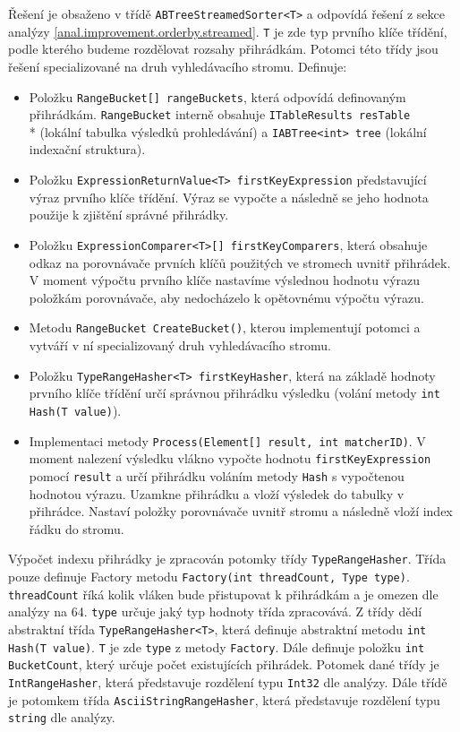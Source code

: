 Řešení je obsaženo v třídě \texttt{ABTreeStreamedSorter<T>} a odpovídá řešení z sekce analýzy \ref{anal.improvement.orderby.streamed}.
\texttt{T} je zde typ prvního klíče třídění, podle kterého budeme rozdělovat rozsahy přihrádkám.
Potomci této třídy jsou řešení specializované na druh vyhledávacího stromu.
Definuje:
\begin{itemize}
\item Položku \texttt{RangeBucket[] rangeBuckets}, která odpovídá definovaným přihrádkám.
\texttt{RangeBucket} interně obsahuje \texttt{ITableResults resTable}\\* (lokální tabulka výsledků prohledávání) a \texttt{IABTree<int> tree} (lokální indexační struktura).

\item Položku \texttt{ExpressionReturnValue<T> firstKeyExpression} představující výraz prvního klíče třídění.
Výraz se vypočte a následně se jeho hodnota použije k zjištění správné přihrádky.
\item Položku \texttt{ExpressionComparer<T>[] firstKeyComparers}, která obsahuje odkaz na porovnávače prvních klíčů použitých ve stromech uvnitř přihrádek.
V moment výpočtu prvního klíče nastavíme výslednou hodnotu výrazu položkám porovnávače, aby nedocházelo k opětovnému výpočtu výrazu.
\item Metodu \texttt{RangeBucket CreateBucket()}, kterou implementují potomci a vytváří v ní specializovaný druh vyhledávacího stromu.
\item Položku \texttt{TypeRangeHasher<T> firstKeyHasher}, která na základě hodnoty prvního klíče třídění určí správnou přihrádku výsledku (volání metody \texttt{int Hash(T value)}).
\item Implementaci metody \texttt{Process(Element[] result, int matcherID)}.
V moment nalezení výsledku vlákno vypočte hodnotu \texttt{firstKeyExpression} pomocí \texttt{result} a určí přihrádku voláním metody \texttt{Hash} s vypočtenou hodnotou výrazu.
Uzamkne přihrádku a vloží výsledek do tabulky v přihrádce.
Nastaví položky porovnávače uvnitř stromu a následně vloží index řádku do stromu. 
\end{itemize}
Výpočet indexu přihrádky je zpracován potomky třídy \texttt{TypeRangeHasher}.
Třída pouze definuje Factory metodu \citep[str. 107]{patterns} \texttt{Factory(int threadCount, Type type)}.
\texttt{threadCount} říká kolik vláken bude přistupovat k přihrádkám a je omezen dle analýzy na 64.
\texttt{type} určuje jaký typ hodnoty třída zpracovává.
Z třídy dědí abstraktní třída \texttt{TypeRangeHasher<T>}, která definuje abstraktní metodu \texttt{int Hash(T value)}.
\texttt{T} je zde \texttt{type} z metody \texttt{Factory}.
Dále definuje položku \texttt{int BucketCount}, který určuje počet existujících přihrádek.
Potomek dané třídy je \texttt{IntRangeHasher}, která představuje rozdělení typu \texttt{Int32} dle analýzy.
Dále třídě je potomkem třída \texttt{AsciiStringRangeHasher}, která představuje rozdělení typu \texttt{string} dle analýzy.

